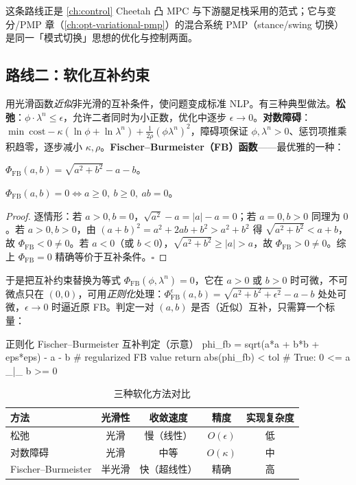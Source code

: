 \noindent 这条路线正是 \cref{ch:control} Cheetah 凸 MPC 与下游腿足栈采用的范式；它与变分/PMP 章（\cref{ch:opt-variational-pmp}）的混合系统 PMP（stance/swing 切换）是同一「模式切换」思想的优化与控制两面。

\subsection{路线二：软化互补约束}
\label{subsec:route-relax}

用光滑函数\emph{近似}非光滑的互补条件，使问题变成标准 NLP。有三种典型做法。\textbf{松弛}：$\phi\cdot\lambda^n\le\epsilon$，允许二者同时为小正数，优化中逐步 $\epsilon\to0$。\textbf{对数障碍}：$\min\ \mathrm{cost}-\kappa(\ln\phi+\ln\lambda^n)+\tfrac{1}{2\rho}(\phi\lambda^n)^2$，障碍项保证 $\phi,\lambda^n>0$、惩罚项推乘积趋零，逐步减小 $\kappa,\rho$。\textbf{Fischer--Burmeister（FB）函数}——最优雅的一种：

\begin{definition}
\label{def:fb}
$\Phi_{\mathrm{FB}}(a,b)=\sqrt{a^2+b^2}-a-b$。
\end{definition}

\begin{theorem}[FB 零点等价于互补]
\label{thm:fb-zero}
$\Phi_{\mathrm{FB}}(a,b)=0\iff a\ge0,\ b\ge0,\ ab=0$。
\end{theorem}
\begin{proof}
逐情形：若 $a>0,b=0$，$\sqrt{a^2}-a=|a|-a=0$；若 $a=0,b>0$ 同理为 $0$。若 $a>0,b>0$，由 $(a+b)^2=a^2+2ab+b^2>a^2+b^2$ 得 $\sqrt{a^2+b^2}<a+b$，故 $\Phi_{\mathrm{FB}}<0\neq0$。若 $a<0$（或 $b<0$），$\sqrt{a^2+b^2}\ge|a|>a$，故 $\Phi_{\mathrm{FB}}>0\neq0$。综上 $\Phi_{\mathrm{FB}}=0$ 精确等价于互补条件。$\square$
\end{proof}

\noindent 于是把互补约束替换为等式 $\Phi_{\mathrm{FB}}(\phi,\lambda^n)=0$，它在 $a>0$ 或 $b>0$ 时可微，不可微点只在 $(0,0)$，可用\emph{正则化}处理：$\Phi_{\mathrm{FB}}^{\epsilon}(a,b)=\sqrt{a^2+b^2+\epsilon^2}-a-b$ 处处可微，$\epsilon\to0$ 时逼近原 FB。判定一对 $(a,b)$ 是否（近似）互补，只需算一个标量：

\begin{codebox}[Python]{正则化 Fischer--Burmeister 互补判定（示意）}
phi_fb = sqrt(a*a + b*b + eps*eps) - a - b   # regularized FB value
return abs(phi_fb) < tol                      # True: 0 <= a _|_ b >= 0
\end{codebox}

\begin{table}[H]\centering\small
\caption{三种软化方法对比}
\label{tab:softening}
\begin{tabular}{lcccc}
\toprule
方法 & 光滑性 & 收敛速度 & 精度 & 实现复杂度 \\
\midrule
松弛 & 光滑 & 慢（线性）& $O(\epsilon)$ & 低 \\
对数障碍 & 光滑 & 中等 & $O(\kappa)$ & 中 \\
Fischer--Burmeister & 半光滑 & 快（超线性）& 精确 & 高 \\
\bottomrule
\end{tabular}
\end{table}

